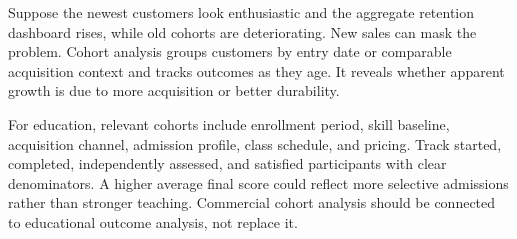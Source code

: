 Suppose the newest customers look enthusiastic and the aggregate retention dashboard rises, while old cohorts are deteriorating. New sales can mask the problem. Cohort analysis groups customers by entry date or comparable acquisition context and tracks outcomes as they age. It reveals whether apparent growth is due to more acquisition or better durability.

For education, relevant cohorts include enrollment period, skill baseline, acquisition channel, admission profile, class schedule, and pricing. Track started, completed, independently assessed, and satisfied participants with clear denominators. A higher average final score could reflect more selective admissions rather than stronger teaching. Commercial cohort analysis should be connected to educational outcome analysis, not replace it.
